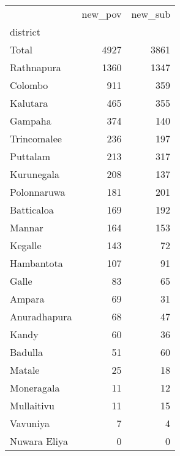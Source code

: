 \begin{tabular}{lrr}
\toprule
{} &  new\_pov &  new\_sub \\
district     &          &          \\
\midrule
Total        &     4927 &     3861 \\
Rathnapura   &     1360 &     1347 \\
Colombo      &      911 &      359 \\
Kalutara     &      465 &      355 \\
Gampaha      &      374 &      140 \\
Trincomalee  &      236 &      197 \\
Puttalam     &      213 &      317 \\
Kurunegala   &      208 &      137 \\
Polonnaruwa  &      181 &      201 \\
Batticaloa   &      169 &      192 \\
Mannar       &      164 &      153 \\
Kegalle      &      143 &       72 \\
Hambantota   &      107 &       91 \\
Galle        &       83 &       65 \\
Ampara       &       69 &       31 \\
Anuradhapura &       68 &       47 \\
Kandy        &       60 &       36 \\
Badulla      &       51 &       60 \\
Matale       &       25 &       18 \\
Moneragala   &       11 &       12 \\
Mullaitivu   &       11 &       15 \\
Vavuniya     &        7 &        4 \\
Nuwara Eliya &        0 &        0 \\
\bottomrule
\end{tabular}
